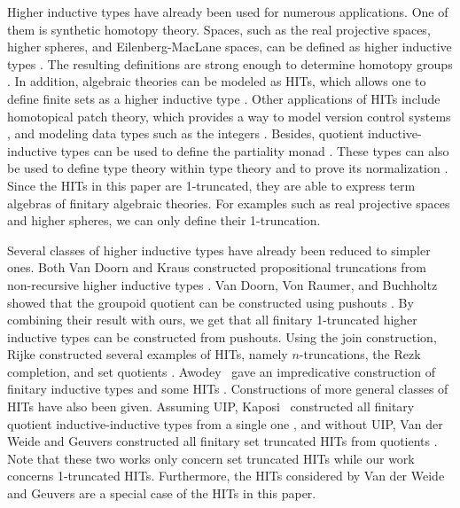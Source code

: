 Higher inductive types have already been used for numerous applications.
One of them is synthetic homotopy theory.
Spaces, such as the real projective spaces, higher spheres, and Eilenberg-MacLane spaces,
can be defined as higher inductive types \cite{licata2013pi,LicataF14,DBLP:conf/lics/BuchholtzR17,hottbook}.
The resulting definitions are strong enough to determine homotopy groups
\cite{licata2013pi,LicataS13}.
In addition, algebraic theories can be modeled as HITs, which allows one
to define finite sets as a higher inductive type \cite{frumin2018finite}.
Other applications of HITs include homotopical patch theory, which provides a way
to model version control systems \cite{AngiuliMLH16}, and modeling data types
such as the integers \cite{BasoldGW17,altenkirchscoccola}.
Besides, quotient inductive-inductive types can be used to define the partiality monad \cite{AltenkirchDK17}.
These types can also be used to define type theory within type theory \cite{AltenkirchK16}
and to prove its normalization \cite{DBLP:journals/lmcs/AltenkirchK17}.
Since the HITs in this paper are 1-truncated, they are able to express term algebras of finitary algebraic theories.
For examples such as real projective spaces and higher spheres, we can only define their 1-truncation.

Several classes of higher inductive types have already been reduced to simpler ones.
Both Van Doorn and Kraus constructed propositional truncations from non-recursive higher inductive types
\cite{Doorn16,Kraus16}.
Van Doorn, Von Raumer, and Buchholtz showed that the groupoid quotient can be constructed using pushouts \cite{DoornRB17}.
By combining their result with ours, we get that all finitary 1-truncated higher inductive types can be constructed from pushouts.
Using the join construction, Rijke constructed several examples of HITs, namely $n$-truncations, the Rezk completion,
and set quotients \cite{rijke2017join}.
Awodey \etal \ gave an impredicative construction of finitary inductive types and some HITs \cite{awodey2018impredicative}. 
Constructions of more general classes of HITs have also been given.
Assuming UIP, Kaposi \etal \ constructed all finitary quotient inductive-inductive types
from a single one \cite{KaposiKA19}, and without UIP, Van der Weide and Geuvers
constructed all finitary set truncated HITs from quotients \cite{van2019construction}.
Note that these two works only concern set truncated HITs while our work concerns 1-truncated HITs.
Furthermore, the HITs considered by Van der Weide and Geuvers are a special case of
the HITs in this paper.


